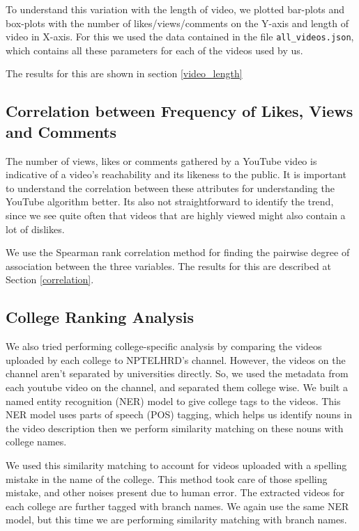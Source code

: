 \documentclass{article}
\begin{document}
To understand this variation with the length of video, we plotted bar-plots and box-plots with the number of likes/views/comments on the Y-axis and length of video in X-axis. For this we used the data contained in the file  \texttt{all\_videos.json}, which contains all these parameters for each of the videos used by us.

The results for this are shown in section \ref{video_length}



\subsection{Correlation between Frequency of Likes, Views and Comments}
The number of views, likes or comments gathered by a YouTube video is indicative of a video's reachability and its likeness to the public. It is important to understand the correlation between these attributes for understanding the YouTube algorithm better. Its also not straightforward to identify the trend, since we see quite often that videos that are highly viewed might also contain a lot of dislikes.  

We use the Spearman rank correlation method for finding the pairwise degree of association between the three variables. The results for this are described at Section \ref{correlation}.

\subsection{College Ranking Analysis}

We also tried performing college-specific analysis by comparing the videos uploaded by each college to NPTELHRD's channel. 
However, the videos on the channel aren't separated by universities directly. So, we used the metadata from each youtube video on the channel, and separated them college wise. We  built a named entity recognition (NER) model to give college tags to the videos. This NER model uses parts of speech (POS) tagging, which helps us identify nouns in the video description then we perform similarity matching on these nouns with college names. 

We used this similarity matching to account for videos uploaded with a spelling mistake in the name of the college. This method took care of those spelling mistake, and other noises present due to human error. The extracted videos for each college are further tagged with branch names. We again use the same NER model, but this time we are performing similarity matching with branch names. 
\end{document}
